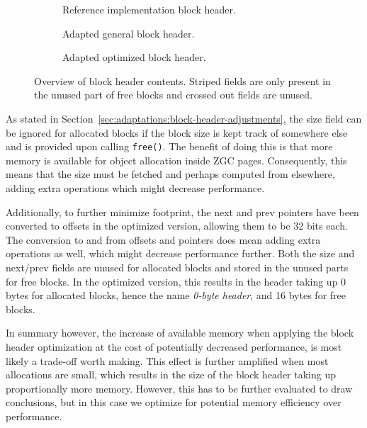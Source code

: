 \begin{figure}[H]
    \centering
    \begin{subfigure}[b]{0.3\textwidth}
        \centering
        
        \caption{Reference implementation block header.}
        \label{fig:blockheader_adap_reference}
    \end{subfigure}%
    \hfill
    \begin{subfigure}[b]{0.3\textwidth}
        \centering
        
        \caption{Adapted general block header.}
        \label{fig:blockheader_adap_general}
    \end{subfigure}%
    \hfill
    \begin{subfigure}[b]{0.3\textwidth}
        \centering
        
        \caption{Adapted optimized block header.}
        \label{fig:blockheader_adap_optimized}
    \end{subfigure}
    \caption{Overview of block header contents. Striped fields are only present in the unused part of free blocks and crossed out fields are unused.}
    \label{fig:blockheader_adaptations}
\end{figure}

As stated in Section~\ref{sec:adaptations:block-header-adjustments}, the size field can be ignored for allocated blocks if the block size is kept track of somewhere else and is provided upon calling \texttt{free()}. The benefit of doing this is that more memory is available for object allocation inside ZGC pages. Consequently, this means that the size must be fetched and perhaps computed from elsewhere, adding extra operations which might decrease performance. 

Additionally, to further minimize footprint, the next and prev pointers have been converted to offsets in the optimized version, allowing them to be 32 bits each. The conversion to and from offsets and pointers does mean adding extra operations as well, which might decrease performance further. Both the size and next/prev fields are unused for allocated blocks and stored in the unused parts for free blocks. In the optimized version, this results in the header taking up 0 bytes for allocated blocks, hence the name \textit{0-byte header}, and 16 bytes for free blocks.

In summary however, the increase of available memory when applying the block header optimization at the cost of potentially decreased performance, is most likely a trade-off worth making. This effect is further amplified when most allocations are small, which results in the size of the block header taking up proportionally more memory. However, this has to be further evaluated to draw conclusions, but in this case we optimize for potential memory efficiency over performance.

